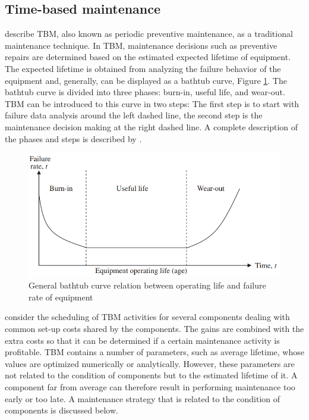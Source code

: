 \subsection{Time-based maintenance} \label{TBM}
\citet{Yam2001} describe TBM, also known as periodic preventive maintenance, as a traditional maintenance technique. In TBM, maintenance decisions such as preventive repairs are determined based on the estimated expected lifetime of equipment. The expected lifetime is obtained from analyzing the failure behavior of the equipment and, generally, can be displayed as a bathtub curve, Figure \ref{fig:bathtubcurve}. The bathtub curve is divided into three phases: burn-in, useful life, and wear-out. TBM can be introduced to this curve in two steps: The first step is to start with failure data analysis around the left dashed line, the second step is the maintenance decision making at the right dashed line. A complete description of the phases and steps is described by \citet{AHMAD2012}.
\begin{figure}[ht]
\centering
\includegraphics[width=\textwidth]{Figures/bathtubcurve}
\caption[General bathtub curve relation between operating life and failure rate of equipment]{General bathtub curve relation between operating life and failure rate of equipment}
\label{fig:bathtubcurve}
\end{figure}

\citet{GUSTAVSSON2014} consider the scheduling of TBM activities for several components dealing with common set-up costs shared by the components. The gains are combined with the extra costs so that it can be determined if a certain maintenance activity is profitable. TBM contains a number of parameters, such as average lifetime, whose values are optimized numerically or analytically.  However, these parameters are not related to the condition of components but to the estimated lifetime of it. A component far from average can therefore result in performing maintenance too early or too late. A maintenance strategy that is related to the condition of components is discussed below.

